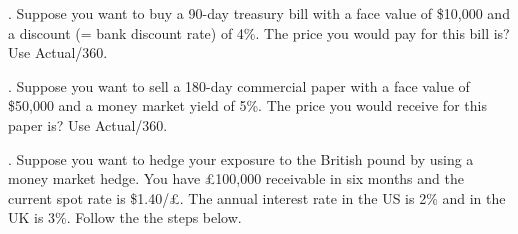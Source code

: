 \documentclass[11.5pt]{article}
\begin{document}
\newcommand*\ruleline[1]{\par\noindent\raisebox{.8ex}{\makebox[\linewidth]{\hrulefill\hspace{1ex}\raisebox{-.8ex}{#1}\hspace{1ex}\hrulefill}}}

\renewcommand{\headheight}{0.7in}
\setlength{\headwidth}{\textwidth}
\renewcommand{\footrulewidth}{0.4pt}
\fancyfoot[L]{\sc{}}
\pagestyle{fancy}
\vspace{1.5cm}
\onehalfspacing

\begin{center}
\large{\textbf{}}
\vspace{1.0cm}
\end{center}



\vspace{20pt}


. Suppose you want to buy a 90-day treasury bill with a face value of \$10,000 and a discount (= bank discount rate) of 4\%. The price you would pay for this bill is? Use Actual/360.

%
%



\vspace{80pt}



. Suppose you want to sell a 180-day commercial paper with a face value of \$50,000 and a money market yield of 5\%. The price you would receive for this paper is? Use Actual/360.

%
%




\vspace{80pt}



. Suppose you want to hedge your exposure to the British pound by using a money market hedge. You have £100,000 receivable in six months and the current spot rate is \$1.40/£. The annual interest rate in the US is 2\% and in the UK is 3\%. Follow the the steps below. 
\end{document}
